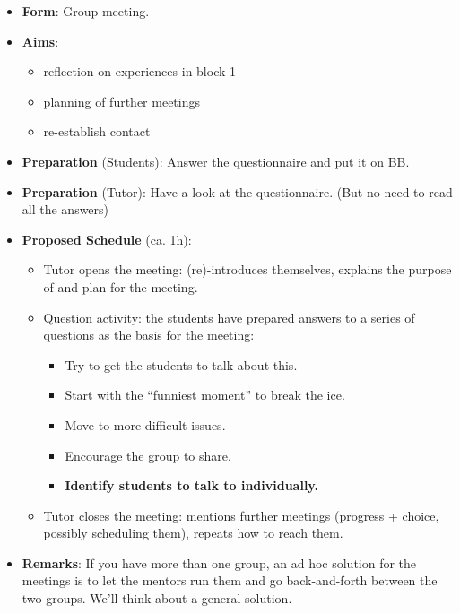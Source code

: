 \begin{itemize}


	\item \textbf{Form}: Group meeting.

	\item \textbf{Aims}:

		\begin{itemize}

			\item reflection on experiences in block 1

			\item planning of further meetings

			\item re-establish contact

		\end{itemize}

	\item \textbf{Preparation} (Students): Answer the questionnaire and put it on BB.

	\item \textbf{Preparation} (Tutor): Have a look at the questionnaire. (But no need to read all the answers)

	\item \textbf{Proposed Schedule} (ca. 1h):

	\begin{itemize}

		\item Tutor opens the meeting: (re)-introduces themselves, explains the purpose of and plan for the meeting.

		\item Question activity: the students have prepared answers to a series of questions as the basis for the meeting:

		\begin{itemize}

			\item Try to get the students to talk about this.

			\item Start with the ``funniest moment'' to break the ice.

			\item Move to more difficult issues.

			\item Encourage the group to share.

			\item \textbf{Identify students to talk to individually.}

		\end{itemize}

		\item Tutor closes the meeting: mentions further meetings (progress + choice, possibly scheduling them), repeats how to reach them.


	\end{itemize}

	\item \textbf{Remarks}: If you have more than one group, an ad hoc solution for the meetings is to let the mentors run them and go back-and-forth between the two groups. We'll think about a general solution.

\end{itemize}


